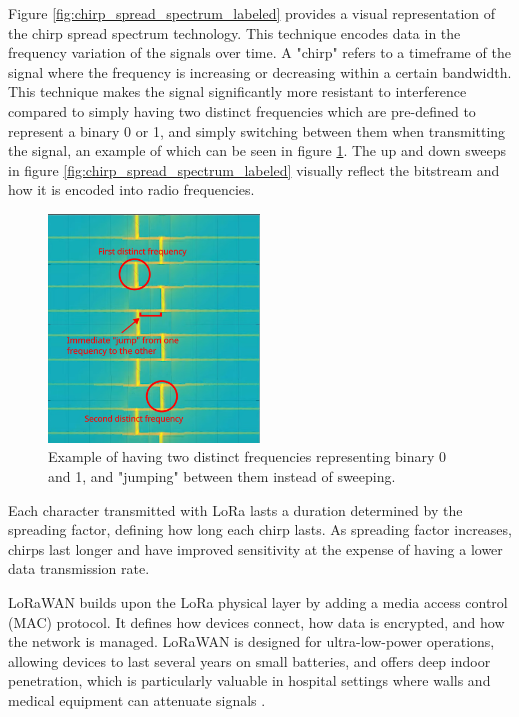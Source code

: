Figure \ref{fig:chirp_spread_spectrum_labeled} provides a visual representation of the chirp spread spectrum technology. This technique encodes data in the frequency variation of the signals over time. A "chirp" refers to a timeframe of the signal where the frequency is increasing or decreasing within a certain bandwidth. This technique makes the signal significantly more resistant to interference compared to simply having two distinct frequencies which are pre-defined to represent a binary 0 or 1, and simply switching between them when transmitting the signal, an example of which can be seen in figure \ref{fig:frequency_shift_keying_labeled}. The up and down sweeps in figure \ref{fig:chirp_spread_spectrum_labeled} visually reflect the bitstream and how it is encoded into radio frequencies.

\begin{figure}[H]
\centering
\includegraphics[width=0.5\textwidth]{images/frequency_shift_keying_labeled.png}
\caption{Example of having two distinct frequencies representing binary 0 and 1, and "jumping" between them instead of sweeping. \cite{Wenner2017_hd}}
\label{fig:frequency_shift_keying_labeled}
\end{figure}

Each character transmitted with LoRa lasts a duration determined by the spreading factor, defining how long each chirp lasts. As spreading factor increases, chirps last longer and have improved sensitivity at the expense of having a lower data transmission rate.

LoRaWAN builds upon the LoRa physical layer by adding a media access control (MAC) protocol. It defines how devices connect, how data is encrypted, and how the network is managed. LoRaWAN is designed for ultra-low-power operations, allowing devices to last several years on small batteries, and offers deep indoor penetration, which is particularly valuable in hospital settings where walls and medical equipment can attenuate signals \cite{lora_documentation}.

